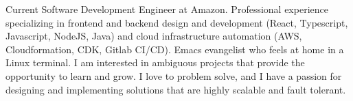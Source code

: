 

\begin{cvparagraph}

Current Software Development Engineer at Amazon. Professional experience specializing in frontend and backend design and development (React, Typescript, Javascript, NodeJS, Java) and cloud infrastructure automation (AWS, Cloudformation, CDK, Gitlab CI/CD). Emacs evangelist who feels at home in a Linux terminal. I am interested in ambiguous projects that provide the opportunity to learn and grow. I love to problem solve, and I have a passion for designing and implementing solutions that are highly scalable and fault tolerant.
\end{cvparagraph}
